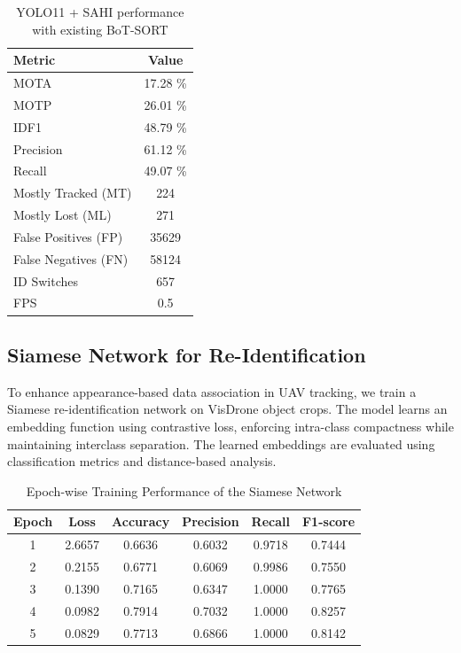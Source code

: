 \documentclass[conference]{IEEEtran}
\begin{document}
\begin{table}[H]
\centering
\caption{YOLO11 + SAHI performance with existing BoT-SORT}
\begin{tabular}{l c}
\toprule
\textbf{Metric} & \textbf{Value} \\
\midrule
MOTA & 17.28 \% \\
MOTP & 26.01 \% \\
IDF1 & 48.79 \% \\
Precision & 61.12 \% \\
Recall & 49.07 \% \\
Mostly Tracked (MT) & 224 \\
Mostly Lost (ML) & 271 \\
False Positives (FP) & 35629 \\
False Negatives (FN) & 58124 \\
ID Switches & 657 \\
FPS & 0.5 \\
\bottomrule
\end{tabular}
\label{tab:botsort_summary}
\end{table}

\subsection{Siamese Network for Re-Identification}

To enhance appearance-based data association in UAV tracking, we train a Siamese re-identification network on VisDrone object crops. The model learns an embedding function using contrastive loss, enforcing intra-class compactness while maintaining interclass separation. The learned embeddings are evaluated using classification metrics and distance-based analysis.

\begin{table}[H]
    \centering
    \caption{Epoch-wise Training Performance of the Siamese Network}
    \begin{tabular}{c c c c c c}
        \hline
        \textbf{Epoch} & \textbf{Loss} & \textbf{Accuracy} & \textbf{Precision} & \textbf{Recall} & \textbf{F1-score} \\
        \hline
        1 & 2.6657 & 0.6636 & 0.6032 & 0.9718 & 0.7444 \\
        2 & 0.2155 & 0.6771 & 0.6069 & 0.9986 & 0.7550 \\
        3 & 0.1390 & 0.7165 & 0.6347 & 1.0000 & 0.7765 \\
        4 & 0.0982 & 0.7914 & 0.7032 & 1.0000 & 0.8257 \\
        5 & 0.0829 & 0.7713 & 0.6866 & 1.0000 & 0.8142 \\
        \hline
    \end{tabular}
    \label{tab:epoch_results}
\end{table}
\end{document}
